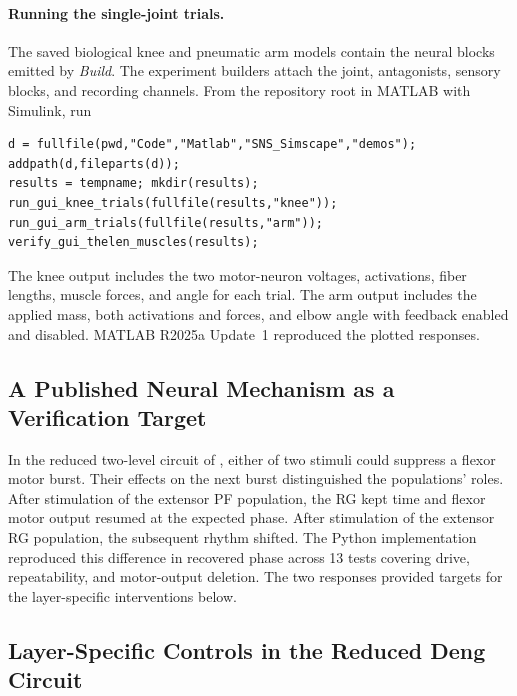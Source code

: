 \paragraph{Running the single-joint trials.}
The saved biological knee and pneumatic arm models contain the neural blocks emitted by \emph{Build}. The experiment builders attach the joint, antagonists, sensory blocks, and recording channels. From the repository root in MATLAB with Simulink, run
\begingroup\small\singlespacing
\begin{verbatim}
d = fullfile(pwd,"Code","Matlab","SNS_Simscape","demos");
addpath(d,fileparts(d));
results = tempname; mkdir(results);
run_gui_knee_trials(fullfile(results,"knee"));
run_gui_arm_trials(fullfile(results,"arm"));
verify_gui_thelen_muscles(results);
\end{verbatim}
\endgroup
The knee output includes the two motor-neuron voltages, activations, fiber lengths, muscle forces, and angle for each trial. The arm output includes the applied mass, both activations and forces, and elbow angle with feedback enabled and disabled. MATLAB R2025a Update~1 reproduced the plotted responses.

\subsection{A Published Neural Mechanism as a Verification Target}\label{sec:rybak_verification}

In the reduced two-level circuit of \citet{rybak_modelling_2006}, either of two stimuli could suppress a flexor motor burst. Their effects on the next burst distinguished the populations' roles. After stimulation of the extensor PF population, the RG kept time and flexor motor output resumed at the expected phase. After stimulation of the extensor RG population, the subsequent rhythm shifted. The Python implementation reproduced this difference in recovered phase across 13 tests covering drive, repeatability, and motor-output deletion. The two responses provided targets for the layer-specific interventions below.

\subsection{Layer-Specific Controls in the Reduced Deng Circuit}\label{sec:app_layer_stimulus}

